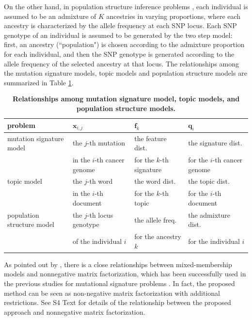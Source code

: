 \documentclass[10pt,letterpaper]{article}
\begin{document}
On the other hand, in population structure inference problems \cite{pmid10835412, pmid19648217}, 
each individual is assumed to be an admixture of $K$ ancestries in varying proportions, 
where each ancestry is characterized by the allele frequency at each SNP locus.
Each SNP genotype of an individual is assumed to be generated by the two step model:
first, an ancestry (``population") is chosen according to the admixture proportion for each individual,
and then the SNP genotype is generated according to the allele frequency of the selected ancestry at that locus.
The relationships among the mutation signature models, topic models and population structure models are summarized in Table \ref{tab_pop}.


\begin{table}[!ht]
\begin{adjustwidth}{-2.25in}{0in} %
\caption{
{\bf Relationships among mutation signature model, topic models, and population structure models.}
}
\begin{tabular}{|l|l|l|l|} \hline
problem & $\bm{x}_{i,j}$ & $\bm{f}_{k}$ & $\bm{q}_{i}$  \\ \hline
mutation signature model & the $j$-th mutation  & the feature dist.  & the signature dist.  \\
& in the $i$-th cancer genome & for the $k$-th signature & for the $i$-th cancer genome \\ \hline
topic model &  the $j$-th word & the word dist. & the topic dist. \\ 
& in the $i$-th document & for the $k$-th topic & for the $i$-th document \\ \hline
population structure model & the $j$-th locus genotype & the allele freq.  & the admixture dist. \\
& of the individual $i$  & for the ancestry $k$ & for the individual $i$ \\
\hline 
\end{tabular}
\label{tab_pop}
\end{adjustwidth}
\end{table}


As pointed out by \cite{ding2008equivalence}, there is a  close relationships between mixed-membership models and nonnegative matrix factorization,
which has been successfully used in the previous studies for mutational signature problems \cite{pmid22608084, pmid23318258, pmid23945592}.
In fact, the proposed method can be seen as non-negative matrix factorization with additional restrictions.
See S4 Text for details of the relationship between the proposed approach and nonnegative matrix factorization.
\end{document}
